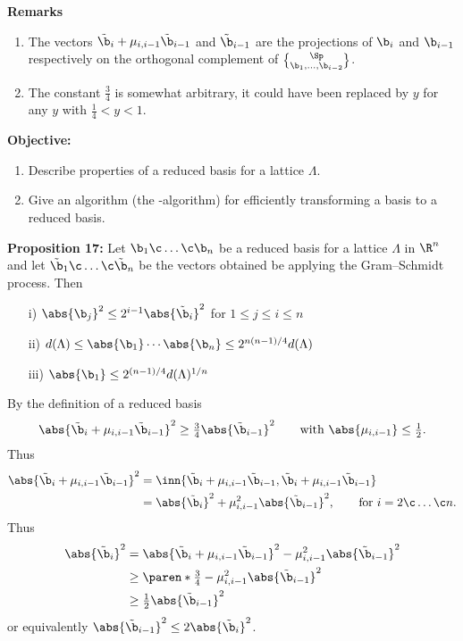 \textbf{Remarks}
\begin{enumerate}
\item The vectors $\tilde\b_i+\mu_{i,i-1}\tilde\b_{i-1}$ and $\tilde\b_{i-1}$ are the projections of $\b_i$ and $\b_{i-1}$ respectively on the orthogonal complement of $\Sp\brace{\b_1,\dotsc,\b_{i-2}}$.
\item The constant $\frac34$ is somewhat arbitrary, it could have been replaced by $y$ for any $y$ with $\frac14<y<1$.
\end{enumerate}
\textbf{Objective:}
\begin{enumerate}
\item Describe properties of a reduced basis for a lattice $\Lambda$.
\item Give an algorithm (the \LLL-algorithm) for efficiently transforming a basis to a reduced basis.
\end{enumerate}
\textbf{Proposition 17:} Let $\b_1\c \dotsc\c \b_n$ be a reduced basis for a lattice $\Lambda$ in $\R^n$ and let $\tilde\b_1\c \dotsc\c \tilde\b_n$ be the vectors obtained be applying the Gram--Schmidt process.  Then
\begin{enumerate}
\item[i)] $\abs{\b_j}^2\leq 2^{i-1}\abs{\tilde\b_i}^2$ for $1\leq j\leq i\leq n$
\item[ii)] $d(\Lambda)\leq\abs{\b_1}\dotsm\abs{\b_n}\leq 2^{n(n-1)/4}d(\Lambda)$
\item[iii)] $\abs{\b_1}\leq 2^{(n-1)/4} d(\Lambda)^{1/n}$
\end{enumerate}
\pf By the definition of a reduced basis
\[ \abs{\tilde\b_i+\mu_{i,i-1}\tilde\b_{i-1}}^2 \geq \tfrac34 \abs{\tilde\b_{i-1}}^2 \qquad\text{with $\abs{\mu_{i,i-1}}\leq\tfrac12$} . \]
Thus
\begin{align*}
\abs{\tilde\b_i+\mu_{i,i-1}\tilde\b_{i-1}}^2 &= \inn{\tilde\b_i+\mu_{i,i-1}\tilde\b_{i-1},\tilde\b_i+\mu_{i,i-1}\tilde\b_{i-1}} \\
&= \abs{\tilde\b_i}^2 + \mu_{i,i-1}^2 \abs{\tilde\b_{i-1}}^2, \qquad\text{for $i=2\c \dotsc\c n$.}
\end{align*}
Thus
\begin{align*}
\abs{\tilde\b_i}^2 &= \abs{\tilde\b_i+\mu_{i,i-1}\tilde\b_{i-1}}^2 - \mu_{i,i-1}^2\abs{\tilde\b_{i-1}}^2 \\
&\geq \paren*{\tfrac34-\mu_{i,i-1}^2}\abs{\tilde\b_{i-1}}^2 \\
&\geq \tfrac12 \abs{\tilde\b_{i-1}}^2
\end{align*}
or equivalently $\abs{\tilde\b_{i-1}}^2\leq2\abs{\tilde\b_i}^2$.

